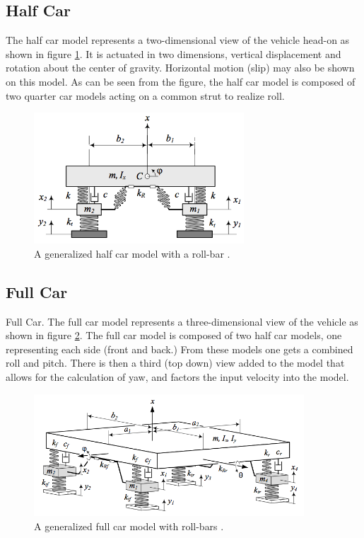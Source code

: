 \subsection{Half Car}
The half car model represents a two-dimensional view of the vehicle head-on as shown in figure \ref{fig:half_car}. It is actuated in two dimensions, vertical displacement and rotation about the center of gravity. Horizontal motion (slip) may also be shown on this model. As can be seen from the figure, the half car model is composed of two quarter car models acting on a common strut to realize roll.

\begin{figure}[t]
	\centering
	\includegraphics[width=0.7\textwidth]{figures/half_car.png}
	\caption{A generalized half car model with a roll-bar \cite{book:jazar}.}
	\label{fig:half_car}
\end{figure}

\subsection{Full Car}
Full Car. The full car model represents a three-dimensional view of the vehicle as shown in figure \ref{fig:full_car}. The full car model is composed of two half car models, one representing each side (front and back.) From these models one gets a combined roll and pitch. There is then a third (top down) view added to the model that allows for the calculation of yaw, and factors the input velocity into the model.

\begin{figure}[t]
	\centering
	\includegraphics[width=0.9\textwidth]{figures/full_car.png}
	\caption{A generalized full car model with roll-bars \cite{book:jazar}.}
	\label{fig:full_car}
\end{figure}

